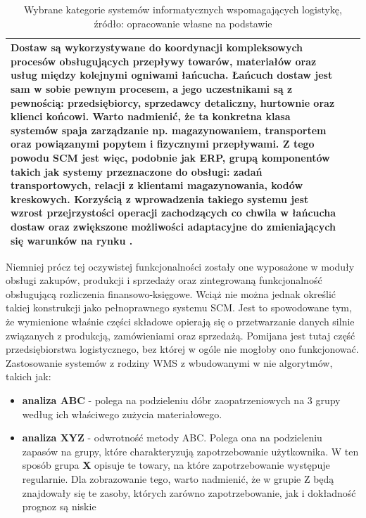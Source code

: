 \begin{table}[H]
\begin{tabular}{| l | l | p{9.5cm} |}
				Dostaw są wykorzystywane do koordynacji kompleksowych procesów obsługujących 
				przepływy towarów, materiałów oraz usług między kolejnymi ogniwami łańcucha. Łańcuch dostaw
				jest sam w sobie pewnym procesem, a jego uczestnikami są z pewnością: przedsiębiorcy,
				sprzedawcy detaliczny, hurtownie oraz klienci końcowi. Warto nadmienić, że ta konkretna 
				klasa systemów spaja zarządzanie np. magazynowaniem, transportem oraz powiązanymi
				popytem i fizycznymi przepływami. Z tego powodu SCM jest więc, podobnie jak ERP, grupą
				komponentów takich jak systemy przeznaczone do obsługi: zadań transportowych, relacji z klientami
				magazynowania, kodów kreskowych. Korzyścią z wprowadzenia takiego systemu jest wzrost
				przejrzystości operacji zachodzących co chwila w łańcucha dostaw oraz zwiększone możliwości
				adaptacyjne do zmieniających się warunków na rynku \cite{scm_system}.\\
				\hline
			\end{tabular}
			\caption[Wybrane kategorie systemów wspomagających logistykę]{
				Wybrane kategorie systemów informatycznych wspomagających logistykę,\\
				źródło: opracowanie własne na podstawie \cite{IDL}
			}
		\end{table}
		Niemniej prócz tej oczywistej funkcjonalności zostały one wyposażone w moduły obsługi zakupów, produkcji i sprzedaży oraz zintegrowaną
		funkcjonalność obsługującą rozliczenia finansowo-księgowe. Wciąż nie można jednak określić takiej
		konstrukcji jako pełnoprawnego systemu SCM. Jest to spowodowane tym, że wymienione właśnie części składowe
		opierają się o przetwarzanie danych silnie związanych z produkcją, zamówieniami oraz sprzedażą. Pomijana 
		jest tutaj część przedsiębiorstwa logistycznego, bez której w ogóle nie mogłoby ono funkcjonować.
		Zastosowanie systemów z rodziny WMS z wbudowanymi w nie algorytmów, takich jak:
		\begin{itemize}
			\item \textbf{analiza ABC} - polega na podzieleniu dóbr zaopatrzeniowych na 3 grupy według ich właściwego zużycia materiałowego.
			\item \textbf{analiza XYZ} - odwrotność metody ABC. Polega ona na podzieleniu zapasów na grupy, które charakteryzują
			zapotrzebowanie użytkownika. W ten sposób grupa \textbf{X} opisuje te towary, na które zapotrzebowanie występuje regularnie.
			Dla zobrazowanie tego, warto nadmienić, że w grupie Z będą znajdowały się te zasoby, których zarówno zapotrzebowanie, 
			jak i dokładność prognoz są niskie 
		\end{itemize}
		

